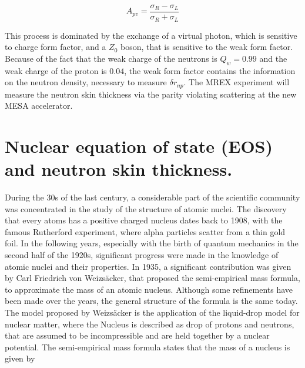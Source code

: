 \begin{equation}
A_{pv} = \dfrac{\sigma_{R} - \sigma_{L}}{\sigma_{R} + \sigma_{L}}
\end{equation}

This process is dominated by the exchange of a virtual photon, which is sensitive to charge form factor, and a $Z_{0}$ boson, that is sensitive to the weak form factor. Because of the fact that the weak charge of the neutrons is $Q_{w} = 0.99$ and the weak charge of the proton is $0.04$, the weak form factor contains the information on the neutron density, necessary to measure $\delta r_{np}$. The MREX experiment will measure the neutron skin thickness via the parity violating scattering at the new MESA accelerator.

\section{Nuclear equation of state (EOS) and neutron skin thickness.}


During the 30s of the last century, a considerable part of the scientific community was concentrated in the study of the structure of atomic nuclei. The discovery that every atoms has a positive charged nucleus dates back to 1908, with the famous Rutherford experiment, where alpha particles scatter from a thin gold foil. In the following years, especially with the birth of quantum mechanics in the second half of the 1920s, significant progress were made in the knowledge of atomic nuclei and their properties. In 1935, a significant contribution was given by Carl Friedrich von Weizsäcker, that proposed the semi-empirical mass formula, to approximate the mass of an atomic nucleus. Although some refinements have been made over the years, the general structure of the formula is the same today. 
The model proposed by Weizsäcker is the application of the liquid-drop model for nuclear matter, where the Nucleus is described as drop of protons and neutrons, that are assumed to be incompressible and are held together by a nuclear potential. The semi-empirical mass formula states that the mass of a nucleus is given by 

